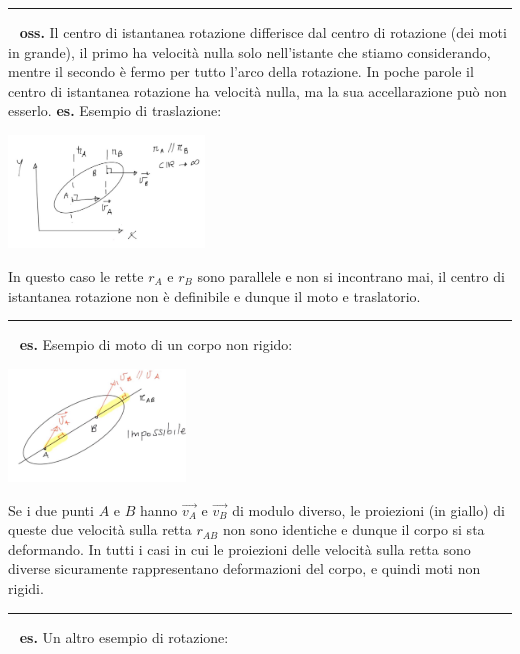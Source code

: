 \rule{\textwidth}{0,4pt}
\ \newline
\textbf{oss.} Il centro di istantanea rotazione differisce dal centro di rotazione (dei moti in grande), il primo ha velocità nulla solo nell'istante che stiamo considerando, mentre il secondo è fermo per tutto l'arco della rotazione. In poche parole il centro di istantanea rotazione ha velocità nulla, ma la sua accellarazione può non esserlo.\newline
\newline
\textbf{es.} Esempio di traslazione:
\begin{center}
    \includegraphics[height=3cm]{../lezione2/img7.JPG}
\end{center}
In questo caso le rette $r_A$ e $r_B$ sono parallele e non si incontrano mai, il centro di istantanea rotazione non è definibile e dunque il moto e traslatorio.\newline
\rule{\textwidth}{0,4pt}
\ \newline
\textbf{es.} Esempio di moto di un corpo non rigido:
\begin{center}
    \includegraphics[height=3cm]{../lezione2/img8.JPG}
\end{center}
Se i due punti $A$ e $B$ hanno $\vec{v_A}$ e $\vec{v_B}$ di modulo diverso, le proiezioni (in giallo) di queste due velocità sulla retta $r_{AB}$ non sono identiche e dunque il corpo si sta deformando. In tutti i casi in cui le proiezioni delle velocità sulla retta sono diverse sicuramente rappresentano deformazioni del corpo, e quindi moti non rigidi.\newline
\rule{\textwidth}{0,4pt}
\ \newline
\textbf{es.} Un altro esempio di rotazione:\newline
